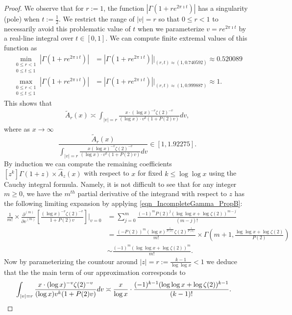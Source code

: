 \documentclass[11pt,reqno,a4letter]{article}
\numberwithin{figure}{section}
\numberwithin{table}{section}
\theoremstyle{plain}
\numberwithin{theorem}{section}
\theoremstyle{definition}
\begin{document}
\begin{proof}
We observe that for $r := 1$, the function $|\Gamma(1+re^{2\pi\imath t})|$ has a 
singularity (pole) when $t := \frac{1}{2}$. We restrict the range of $|v| = r$ 
so that $0 \leq r < 1$ to necessarily avoid this problematic value of $t$ when 
we parameterize $v = r e^{2\pi\imath t}$ by a real-line integral over $t \in [0, 1]$. 
We can compute finite extremal values of this function as 
\begin{align*} 
\min\limits_{\substack{0 \leq r < 1 \\ 0 \leq t \leq 1}} |\Gamma(1+re^{2\pi\imath t})| & = 
     |\Gamma(1+re^{2\pi\imath t})| \Biggr\rvert_{(r,t) \approx (1, 0.740592)} \approx 
     0.520089 \\ 
\max\limits_{\substack{0 \leq r < 1 \\ 0 \leq t \leq 1}} |\Gamma(1+re^{2\pi\imath t})| & = 
     |\Gamma(1+re^{2\pi\imath t})| \Biggr\rvert_{(r,t) \approx (1, 0.999887)} \approx 1. 
\end{align*} 
This shows that 
\begin{align} 
\label{eqn_WideTildeArx_CountourIntDef_v2} 
\widetilde{A}_r(x) \asymp 
     \int_{|v|=r} \frac{x \cdot (\log x)^{-v} \zeta(2)^{-v}}{(\log x) \cdot 
     v^{k} (1 + P(2) v)} dv, 
\end{align} 
where as $x \rightarrow \infty$ 
\[
\frac{\widetilde{A}_r(x)}{\int_{|v|=r} \frac{x (\log x)^{-v} \zeta(2)^{-v}}{(\log x) \cdot 
     v^{k} (1 + P(2) v)} dv} \in [1, 1.92275]. 
\] 
By induction we can compute the remaining coefficients 
$[z^k] \Gamma(1+z) \times \widehat{A}_z(x)$ with respect to 
$x$ for fixed $k \leq \log\log x$ using the Cauchy integral formula. 
Namely, it is not difficult to see that for any integer $m \geq 0$, 
we have the $m^{th}$ partial derivative of the integrand with respect to $z$ 
has the following limiting expansion by applying 
\eqref{eqn_IncompleteGamma_PropB}: 
\begin{align*} 
\frac{1}{m!} \times \frac{\partial^{(m)}}{{\partial v}^{(m)}}\left[ 
     \frac{(\log x)^{-v} \zeta(2)^{-v}}{1 + P(2) v}\right] \Biggr\rvert_{v=0} & = 
     \sum_{j=0}^{m} \frac{(-1)^{m} P(2)^{j} (\log\log x + \log\zeta(2))^{m-j}}{(m-j)!} \\ 
     & = 
     \frac{(-P(2))^{m} (\log x)^{\frac{1}{P(2)}} \zeta(2)^{\frac{1}{P(2)}}}{m!} \times 
     \Gamma\left(m+1, \frac{\log\log x + \log\zeta(2)}{P(2)}\right) \\ 
     & \sim \frac{(-1)^m (\log\log x + \log\zeta(2))^{m}}{m!}. 
\end{align*} 
Now by parameterizing the countour around $|z| = r := \frac{k-1}{\log\log x} < 1$ we 
deduce that the the main term of our approximation corresponds to 
\begin{align*} 
\int_{|v|=r} \frac{x \cdot (\log x)^{-v} \zeta(2)^{-v}}{(\log x) v^{k} (1 + P(2) v)} dv & \asymp 
     \frac{x}{\log x} \cdot \frac{(-1)^{k-1} (\log\log x + \log\zeta(2))^{k-1}}{(k-1)!}. 
     \qedhere 
\end{align*} 
\end{proof} 
\end{document}
